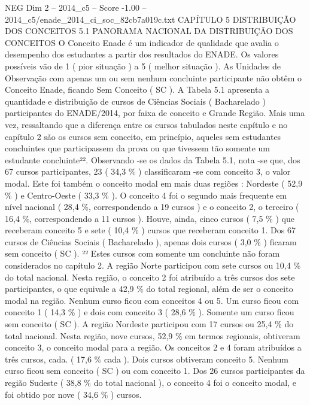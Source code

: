 \begin{textsample}{NEG Dim 2 – 2014\_c5 – Score -1.00 – 2014\_c5/enade\_2014\_ci\_soc\_82cb7a019c.txt}  \label{ex:f2_neg_128}
CAPÍTULO 5 DISTRIBUIÇÃO DOS CONCEITOS 5.1 PANORAMA NACIONAL DA DISTRIBUIÇÃO DOS CONCEITOS O Conceito Enade é um indicador de qualidade que avalia o desempenho dos estudantes a partir dos resultados do ENADE.
Os valores possíveis vão de 1 ( pior situação ) a 5 ( melhor situação ).
As Unidades de Observação com apenas um ou sem nenhum concluinte participante não obtêm o Conceito Enade, ficando Sem Conceito ( SC ).
A Tabela 5.1 apresenta a quantidade e distribuição de cursos de Ciências Sociais ( Bacharelado ) participantes do ENADE/2014, por faixa de conceito e Grande Região.
Mais uma vez, ressaltando que a diferença entre os cursos tabulados neste capítulo e no capítulo 2 são os cursos sem conceito, em princípio, aqueles sem estudantes concluintes que participassem da prova ou que tivessem tão somente um estudante concluinte²².
Observando -se os dados da Tabela 5.1, nota -se que, dos 67 cursos participantes, 23 ( 34,3 \% ) classificaram -se com conceito 3, o valor modal.
Este foi também o conceito modal em mais duas regiões : Nordeste ( 52,9 \% ) e Centro-Oeste ( 33,3 \% ).
O conceito 4 foi o segundo mais frequente em nível nacional ( 28,4 \%, correspondendo a 19 cursos ) e o conceito 2, o terceiro ( 16,4 \%, correspondendo a 11 cursos ).
Houve, ainda, cinco cursos ( 7,5 \% ) que receberam conceito 5 e sete ( 10,4 \% ) cursos que receberam conceito 1.
Dos 67 cursos de Ciências Sociais ( Bacharelado ), apenas dois cursos ( 3,0 \% ) ficaram sem conceito ( SC ). ²² Estes cursos com somente um concluinte não foram considerados no capítulo 2.
A região Norte participou com sete cursos ou 10,4 \% do total nacional.
Nesta região, o conceito 2 foi atribuído a três cursos dos sete participantes, o que equivale a 42,9 \% do total regional, além de ser o conceito modal na região.
Nenhum curso ficou com conceitos 4 ou 5.
Um curso ficou com conceito 1 ( 14,3 \% ) e dois com conceito 3 ( 28,6 \% ).
Somente um curso ficou sem conceito ( SC ).
A região Nordeste participou com 17 cursos ou 25,4 \% do total nacional.
Nesta região, nove cursos, 52,9 \% em termos regionais, obtiveram conceito 3, o conceito modal para a região.
Os conceitos 2 e 4 foram atribuídos a três cursos, cada. ( 17,6 \% cada ).
Dois cursos obtiveram conceito 5.
Nenhum curso ficou sem conceito ( SC ) ou com conceito 1.
Dos 26 cursos participantes da região Sudeste ( 38,8 \% do total nacional ), o conceito 4 foi o conceito modal, e foi obtido por nove ( 34,6 \% ) cursos.

\end{textsample}
